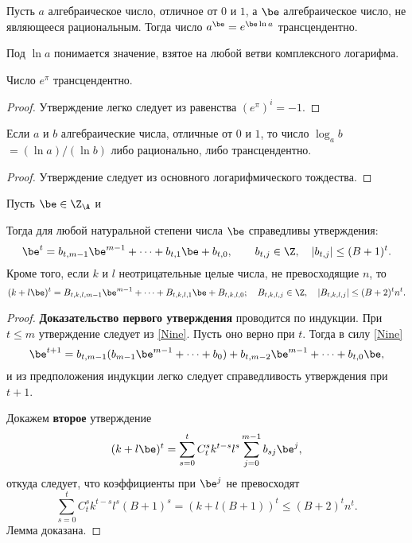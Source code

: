 \documentclass{article}
\begin{document}
\begin{theorem}
Пусть $a$  алгебраическое число,
отличное от $0$  и $1$, а $\be$   алгебраическое число,
не являющееся рациональным.  Тогда число $a^{\be}=e^{\be\ln a}$
трансцендентно.
\end{theorem}

\begin{note}
Под $\ln a$ понимается значение, взятое на любой ветви комплексного логарифма.
\end{note}

\begin{imp}Число $e^{\pi}$ трансцендентно.
\end{imp}
\begin{proof} Утверждение легко следует из равенства $(e^{\pi})^i=-1$. \end{proof}

\begin{imp}
Если $a$  и $b$  алгебраические числа,
отличные  от $0$  и $1$,  то число $\log_ab$ $=(\ln a)/(\ln b)$
либо рационально, либо трансцендентно.
\end{imp}
\begin{proof}
Утверждение следует из основного логарифмического тождества.
\end{proof}

\begin{lemma}\label{LemmaFour}
Пусть $\be\in\Z_{\A}$ и


Тогда для любой натуральной степени   числа  $\be$ справедливы утверждения:
$$
\be^t=b_{t,m-1}\be^{m-1}+\dots + b_{t,1}\be +b_{t,0}, \qquad
b_{t,j}\in\Z, \quad |b_{t,j}| \le (B+1)^t.
$$
Кроме того, если $k$  и $l$   неотрицательные целые
числа, не превосходящие $n$,  то
$$
(k+l\be)^t=B_{t,k,l,m-1}\be^{m-1}+\dots +B_{t,k,l,1}\be +B_{t,k,l,0};
\quad B_{t,k,l,j}\in \Z, \quad |B_{t,k,l,j}|\le (B+2)^tn^t.
$$
\end{lemma}

\begin{proof}
\textbf{Доказательство первого утверждения}
проводится по индукции. При $t\le m$ утверждение следует
из \eqref{Nine}. Пусть оно верно при $t$. Тогда в силу \eqref{Nine}
$$
\be^{t+1}=b_{t,m-1}(b_{m-1}\be^{m-1}+ \dots +b_0)+
b_{t,m-2}\be^{m-1}+ \dots +b_{t,0}\be,
$$
и из предположения индукции легко следует справедливость утверждения  при $t+1$.

Докажем \textbf{второе} утверждение
$$
(k+l\be)^t=\sum_{s=0}^tC_t^sk^{t-s}l^s\sum_{j=0}^{m-1}b_{sj}\be^j,
$$
откуда следует, что коэффициенты при $\be^j$ не превосходят
$$
\sum_{s=0}^tC_t^sk^{t-s}l^s(B+1)^s=(k+l(B+1))^t \le (B+2)^tn^t.
$$
Лемма доказана.
\end{proof}
\end{document}
